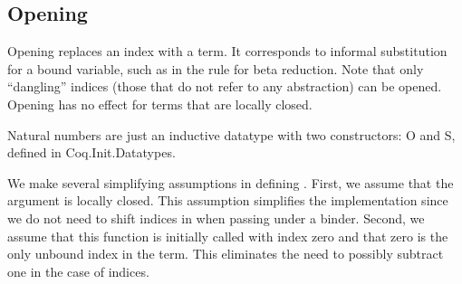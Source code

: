 \documentclass[12pt]{report}
\begin{document}
\begin{coqdoccode}
\coqdocemptyline
\end{coqdoccode}
\subsection{Opening}



 Opening replaces an index with a term. It corresponds to informal
    substitution for a bound variable, such as in the rule for beta
    reduction. Note that only ``dangling'' indices (those that do not
    refer to any abstraction) can be opened. Opening has no effect for
    terms that are locally closed.


    Natural numbers are just an inductive datatype with two
    constructors: O and S, defined in Coq.Init.Datatypes.


    We make several simplifying assumptions in defining .
    First, we assume that the argument  is locally closed.  This
    assumption simplifies the implementation since we do not need to
    shift indices in  when passing under a binder.  Second, we
    assume that this function is initially called with index zero and
    that zero is the only unbound index in the term.  This eliminates
    the need to possibly subtract one in the case of indices.
\end{document}
